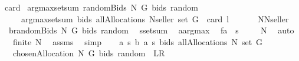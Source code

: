 \begin{isabellebody}
{\isachardoublequoteopen}card\ {\isacharparenleft}\isanewline
{\isacharparenleft}argmax{\isasymcirc}setsum{\isacharparenright}\ {\isacharparenleft}randomBids{\isacharprime}\ N\ G\ bids\ random{\isacharparenright}\isanewline
\ \ \ \ {\isacharparenleft}{\isacharparenleft}argmax{\isasymcirc}setsum{\isacharparenright}\ bids\ {\isacharparenleft}allAllocations\ {\isacharparenleft}N{\isasymunion}{\isacharbraceleft}seller{\isacharbraceright}{\isacharparenright}\ {\isacharparenleft}set\ G{\isacharparenright}{\isacharparenright}{\isacharparenright}{\isacharparenright}{\isacharequal}{}{\isachardoublequoteclose}\ {\isacharparenleft}\ {\isachardoublequoteopen}card\ {\isacharquery}l{\isacharequal}{\isacharunderscore}{\isachardoublequoteclose}{\isacharparenright}\isanewline
%
\isadelimproof
%
\endisadelimproof
%
\isatagproof
{}\isamarkupfalse%
\ {\isacharminus}\ \isanewline
\ \ \isamarkupfalse%
\ {\isacharquery}N{\isacharequal}{\isachardoublequoteopen}N{\isasymunion}{\isacharbraceleft}seller{\isacharbraceright}{\isachardoublequoteclose}\ \isamarkupfalse%
\ {\isacharquery}b{\isacharprime}{\isacharequal}{\isachardoublequoteopen}randomBids{\isacharprime}\ N\ G\ bids\ random{\isachardoublequoteclose}\ \isamarkupfalse%
\ {\isacharquery}s{\isacharequal}setsum\ \isamarkupfalse%
\ {\isacharquery}a{\isacharequal}argmax\ \isamarkupfalse%
\ {\isacharquery}f{\isacharequal}{\isachardoublequoteopen}{\isacharquery}a\ {\isasymcirc}\ {\isacharquery}s{\isachardoublequoteclose}\isanewline
\ \ \isamarkupfalse%
\ {}{\isacharcolon}\ {\isachardoublequoteopen}{\isacharquery}N{\isasymnoteq}{\isacharbraceleft}{\isacharbraceright}{\isachardoublequoteclose}\ \isamarkupfalse%
\ auto\ \isamarkupfalse%
\ {}{\isacharcolon}\ {\isachardoublequoteopen}finite\ {\isacharquery}N{\isachardoublequoteclose}\ \isamarkupfalse%
\ assms{\isacharparenleft}{}{\isacharparenright}\ \isamarkupfalse%
\ simp\isanewline
\ \ \isamarkupfalse%
\ {\isachardoublequoteopen}{\isacharquery}a\ {\isacharparenleft}{\isacharquery}s\ {\isacharquery}b{\isacharprime}{\isacharparenright}\ {\isacharparenleft}{\isacharquery}a\ {\isacharparenleft}{\isacharquery}s\ bids{\isacharparenright}\ {\isacharparenleft}allAllocations\ {\isacharquery}N\ {\isacharparenleft}set\ G{\isacharparenright}{\isacharparenright}{\isacharparenright}{\isacharequal}\isanewline
\ \ {\isacharbraceleft}chosenAllocation{\isacharprime}\ {\isacharquery}N\ G\ bids\ random{\isacharbraceright}{\isachardoublequoteclose}\ {\isacharparenleft}\ {\isachardoublequoteopen}{\isacharquery}L{\isacharequal}{\isacharquery}R{\isachardoublequoteclose}{\isacharparenright}\isanewline

\end{isabellebody}
